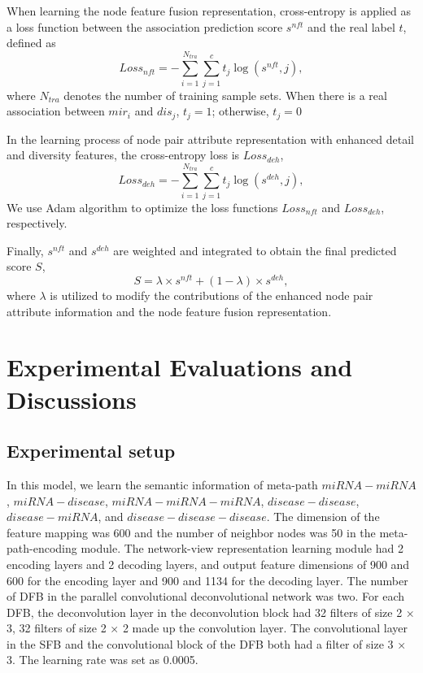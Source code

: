\documentclass[journal,twoside,web]{ieeecolor}
\begin{document}
When learning the node feature fusion representation, cross-entropy is applied as a loss function between the association prediction score ${s^{nft}}$ and the real label $t$, defined as
\begin{equation}
Los{s_{nft}} =  - \sum\limits_{i = 1}^{{{{N}}_{tra}}} {\sum\limits_{j = 1}^c {{t_j}\log \left( {{s^{nft}},j} \right)} },
\end{equation}
where ${N_{tra}}$ denotes the number of training sample sets. When there is a real association between $mi{r_i}$ and $di{s_j}$, ${t_j} = 1$; otherwise, ${t_j} = 0$

In the learning process of node pair attribute representation with enhanced detail and diversity features, the cross-entropy loss is $Los{s_{deh}}$,
\begin{equation}
Los{s_{deh}} =  - \sum\limits_{i = 1}^{{{{N}}_{tra}}} {\sum\limits_{j = 1}^c {{t_j}\log \left( {{s^{deh}},j} \right)} },
\end{equation}
We use Adam algorithm \cite{2014Adam} to optimize the loss functions $Los{s_{nft}}$ and $Los{s_{deh}}$, respectively. 

Finally, ${s^{nft}}$ and ${s^{deh}}$ are weighted and integrated to obtain the final predicted score $S$,
\begin{equation}
S = \lambda  \times {s^{nft}} + \left( {1 - \lambda } \right) \times {s^{deh}},
\end{equation}
where $\lambda $ is utilized to modify the contributions of the enhanced node pair attribute information and the node feature fusion representation.

\section{Experimental Evaluations and Discussions}

\subsection{Experimental setup}

In this model, we learn the semantic information of meta-path $miRNA - miRNA$, $miRNA - disease$, $miRNA - miRNA - miRNA$, $disease - disease$, $disease - miRNA$, and $disease - disease - disease$. The dimension of the feature mapping was 600 and the number of neighbor nodes was 50 in the meta-path-encoding module. The network-view representation learning module had 2 encoding layers and 2 decoding layers, and output feature dimensions of 900 and 600 for the encoding layer and 900 and 1134 for the decoding layer. The number of DFB in the parallel convolutional deconvolutional network was two. For each DFB, the deconvolution layer in the deconvolution block had 32 filters of size 2 × 3, 32 filters of size 2 × 2 made up the convolution layer. The convolutional layer in the SFB and the convolutional block of the DFB both had a filter of size 3 × 3. The learning rate was set as 0.0005.
\end{document}
